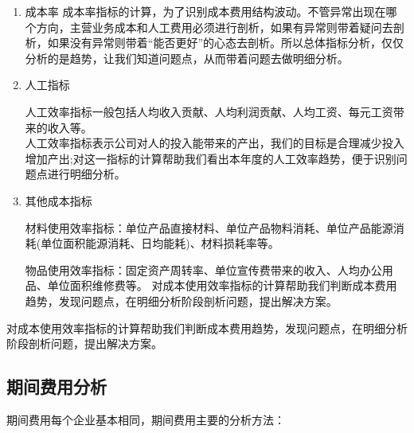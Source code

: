 \documentclass[linespread=1.5,a4paper]{ctexart}
\begin{document}
\begin{enumerate}
	\item{成本率}	成本率指标的计算，为了识别成本费用结构波动。不管异常出现在哪个方向，主营业务成本和人工费用必须进行剖析，如果有异常则带着疑问去剖析，如果没有异常则带着“能否更好”的心态去剖析。所以总体指标分析，仅仅分析的是趋势，让我们知道问题点，从而带着问题去做明细分析。
	
	\item 人工指标
	
	人工效率指标一般包括人均收入贡献、人均利润贡献、人均工资、每元工资带来的收入等。\\	
	人工效率指标表示公司对人的投入能带来的产出，我们的目标是合理减少投入增加产出;对这一指标的计算帮助我们看出本年度的人工效率趋势，便于识别问题点进行明细分析。
	
	\item 其他成本指标
	
	材料使用效率指标：单位产品直接材料、单位产品物料消耗、单位产品能源消耗(单位面积能源消耗、日均能耗)、材料损耗率等。
	
	物品使用效率指标：固定资产周转率、单位宣传费带来的收入、人均办公用品、单位面积维修费等。	
	对成本使用效率指标的计算帮助我们判断成本费用趋势，发现问题点，在明细分析阶段剖析问题，提出解决方案。
	
	
\end{enumerate}

对成本使用效率指标的计算帮助我们判断成本费用趋势，发现问题点，在明细分析阶段剖析问题，提出解决方案。

\subsection{期间费用分析}
期间费用每个企业基本相同，期间费用主要的分析方法：
\end{document}
